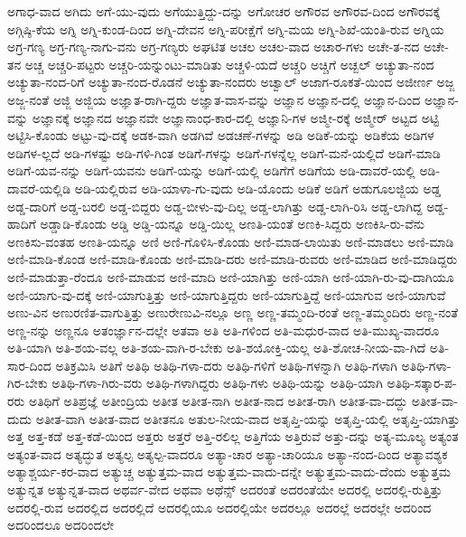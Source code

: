 {ಅಗಾಧ-ವಾದ
ಅಗಿದು
ಅಗೆ-ಯು-ವುದು
ಅಗೆಯುತ್ತಿದ್ದು-ದನ್ನು
ಅಗೋಚರ
ಅಗೌರವ
ಅಗೌರವ-ದಿಂದ
ಅಗೌರವಕ್ಕೆ
ಅಗ್ಗಿಷ್ಠಿ-ಕೆಯ
ಅಗ್ನಿ
ಅಗ್ನಿ-ಕುಂಡ-ದಿಂದ
ಅಗ್ನಿ-ದೇವನ
ಅಗ್ನಿ-ಪರೀಕ್ಷೆಗೆ
ಅಗ್ನಿ-ಮಯ
ಅಗ್ನಿ-ಶಿಖೆ-ಯಂತಿ-ರುವ
ಅಗ್ನಿಯ
ಅಗ್ರ-ಗಣ್ಯ
ಅಗ್ರ-ಗಣ್ಯ-ನಾಗು-ವನು
ಅಗ್ರ-ಗಣ್ಯರು
ಅಘಟಿತ
ಅಚಲ
ಅಚಲ-ವಾದ
ಅಚಾರ-ಗಳು
ಅಚೇ-ತ-ನದ
ಅಚೇ-ತನ
ಅಚ್ಚ
ಅಚ್ಚರಿ-ಪಟ್ಟರು
ಅಚ್ಚರಿ-ಯನ್ನುಂಟು-ಮಾಡಿತು
ಅಚ್ಚಳಿ-ಯದೆ
ಅಚ್ಚರಿ
ಅಚ್ಚಿಗೆ
ಅಚ್ಬಲ್
ಅಚ್ಯುತಾ-ನಂದ
ಅಚ್ಯುತಾ-ನಂದ-ರಿಗೆ
ಅಚ್ಯುತಾ-ನಂದ-ರೊಡನೆ
ಅಚ್ಯುತಾ-ನಂದರು
ಅಚ್ವಾಲ್
ಅಜಾಗ-ರೂಕತೆ-ಯಿಂದ
ಅಜೀರ್ಣ
ಅಜ್ಜ
ಅಜ್ಜ-ನಂತೆ
ಅಜ್ಜಿ
ಅಜ್ಜಿಯ
ಅಜ್ಞಾತ-ರಾಗಿ-ದ್ದರು
ಅಜ್ಞಾತ-ವಾಸ-ವನ್ನು
ಅಜ್ಞಾನ
ಅಜ್ಞಾನ-ದಲ್ಲಿ
ಅಜ್ಞಾನ-ದಿಂದ
ಅಜ್ಞಾನ-ವನ್ನು
ಅಜ್ಞಾನಕ್ಕೆ
ಅಜ್ಞಾನದ
ಅಜ್ಞಾನವೇ
ಅಜ್ಞಾನಾಂಧ-ಕಾರ-ದಲ್ಲಿ
ಅಜ್ಞಾನಿ-ಗಳ
ಅಜ್ಮೀ-ರಕ್ಕೆ
ಅಜ್ಮೀರ್
ಅಟ್ಟದ
ಅಟ್ಟಿ
ಅಟ್ಟಿಸಿ-ಕೊಂಡು
ಅಟ್ಟು-ವು-ದಕ್ಕೆ
ಅಡಕ-ವಾಗಿ
ಅಡಗಿವೆ
ಅಡಚಣೆ-ಗಳನ್ನು
ಅಡಿ
ಅಡಿಕೆ-ಯನ್ನು
ಅಡಿಕೆಯ
ಅಡಿಗಳ
ಅಡಿಗಳ-ಲ್ಲದೆ
ಅಡಿ-ಗಳಷ್ಟು
ಅಡಿ-ಗಳಿ-ಗಿಂತ
ಅಡಿಗೆ-ಗಳನ್ನು
ಅಡಿಗೆ-ಗಳನ್ನೆಲ್ಲ
ಅಡಿಗೆ-ಮನೆ-ಯಲ್ಲಿದೆ
ಅಡಿಗೆ-ಮಾಡಿ
ಅಡಿಗೆ-ಯವ-ನನ್ನು
ಅಡಿಗೆ-ಯವನು
ಅಡಿಗೆ-ಯನ್ನು
ಅಡಿಗೆ-ಯಲ್ಲಿ
ಅಡಿಗೆಗೆ
ಅಡಿಗೆಯ
ಅಡಿ-ದಾವರೆ-ಯಲ್ಲಿ
ಅಡಿ-ದಾವರೆ-ಯಲ್ಲಿಡಿ
ಅಡಿ-ಯಲ್ಲಿರುವ
ಅಡಿ-ಯಾಳಾ-ಗು-ವುದು
ಅಡಿ-ಯೊಂದು
ಅಡಿಕೆ
ಅಡಿಗೆ
ಅಡುಗೂಲಜ್ಜಿಯ
ಅಡ್ಡ
ಅಡ್ಡ-ದಾರಿಗೆ
ಅಡ್ಡ-ಬರಲಿ
ಅಡ್ಡ-ಬಿದ್ದರು
ಅಡ್ಡ-ಬೀಳು-ವು-ದಿಲ್ಲ
ಅಡ್ಡ-ಲಾಗಿತ್ತು
ಅಡ್ಡ-ಲಾಗಿ-ರಿಸಿ
ಅಡ್ಡ-ಲಾಗಿದ್ದ
ಅಡ್ಡ-ಹಾದಿಗೆ
ಅಡ್ಡಾಡಿ-ಕೊಂಡು
ಅಡ್ಡಿ
ಅಡ್ಡಿ-ಯನ್ನೂ
ಅಡ್ಡಿ-ಯಿಲ್ಲ
ಅಣತಿ-ಯಂತೆ
ಅಣಕಿ-ಸಿದ್ದರು
ಅಣಕಿಸಿ-ರು-ವೆನು
ಅಣಕಿಸು-ವಂತಹ
ಅಣತಿ-ಯನ್ನೂ
ಅಣಿ
ಅಣಿ-ಗೊಳಿಸಿ-ಕೊಂಡು
ಅಣಿ-ಮಾಡ-ಲಾಯಿತು
ಅಣಿ-ಮಾಡಲು
ಅಣಿ-ಮಾಡಿ
ಅಣಿ-ಮಾಡಿ-ಕೊಂಡ
ಅಣಿ-ಮಾಡಿ-ಕೊಂಡು
ಅಣಿ-ಮಾಡಿ-ದರು
ಅಣಿ-ಮಾಡಿ-ರುವರು
ಅಣಿ-ಮಾಡಿದ
ಅಣಿ-ಮಾಡಿದ್ದರು
ಅಣಿ-ಮಾಡುತ್ತಾ-ರೆಂದೂ
ಅಣಿ-ಮಾಡುವ
ಅಣಿ-ಮಾದಿ
ಅಣಿ-ಯಾಗಿತ್ತು
ಅಣಿ-ಯಾಗಿ
ಅಣಿ-ಯಾಗಿ-ರು-ವು-ದಾಗಿಯೂ
ಅಣಿ-ಯಾಗು-ವು-ದಕ್ಕೆ
ಅಣಿ-ಯಾಗುತ್ತಿತ್ತು
ಅಣಿ-ಯಾಗುತ್ತಿದ್ದರು
ಅಣಿ-ಯಾಗುತ್ತಿದ್ದೆ
ಅಣಿ-ಯಾಗುವ
ಅಣಿ-ಯಾಗುವೆ
ಅಣು-ವಿನ
ಅಣುರಣಿತ-ವಾಗುತ್ತಿತ್ತು
ಅಣುರೇಣುವಿ-ನಲ್ಲೂ
ಅಣ್ಣ
ಅಣ್ಣ-ತಮ್ಮಂದಿ-ರಂತೆ
ಅಣ್ಣ-ತಮ್ಮಂದಿರು
ಅಣ್ಣ-ನಂತೆ
ಅಣ್ಣ-ನನ್ನು
ಅಣ್ಣನೂ
ಅತಂರ್ಜ್ಞಾನ-ದಲ್ಲೇ
ಅತವಾ
ಅತಿ
ಅತಿ-ಗಳಿಂದ
ಅತಿ-ಮಧುರ-ವಾದ
ಅತಿ-ಮುಖ್ಯ-ವಾದರೂ
ಅತಿ-ಯಾಗಿ
ಅತಿ-ಶಯ-ವಲ್ಲ
ಅತಿ-ಶಯ-ವಾಗಿ-ರ-ಬೇಕು
ಅತಿ-ಶಯೋಕ್ತಿ-ಯಲ್ಲ
ಅತಿ-ಶೋಚ-ನೀಯ-ವಾ-ಗಿದೆ
ಅತಿ-ಸಾರ-ದಿಂದ
ಅತಿಕ್ರಮಿಸಿ
ಅತಿಗೆ
ಅತಿಥಿ
ಅತಿಥಿ-ಗಳಾ-ದರು
ಅತಿಥಿ-ಗಳಿಗೆ
ಅತಿಥಿ-ಗಳನ್ನಾಗಿ
ಅತಿಥಿ-ಗಳಾಗಿ
ಅತಿಥಿ-ಗಳಾ-ಗಿರ-ಬೇಕು
ಅತಿಥಿ-ಗಳಾ-ಗಿರು-ವರು
ಅತಿಥಿ-ಗಳಾಗಿದ್ದರು
ಅತಿಥಿ-ಗಳು
ಅತಿಥಿ-ಯನ್ನು
ಅತಿಥಿ-ಯಾಗಿ
ಅತಿಥಿ-ಸತ್ಕಾರ-ಪ-ರರು
ಅತಿಥಿಗೆ
ಅತಿಪ್ರಜ್ಞೆ
ಅತೀಂದ್ರಿಯ
ಅತೀತ
ಅತೀತ-ನಾಗಿ
ಅತೀತ-ನಾದ
ಅತೀತ-ರಾಗಿ
ಅತೀತ-ವಾ-ದದ್ದು
ಅತೀತ-ವಾ-ದುದು
ಅತೀತ-ವಾಗಿ
ಅತೀತ-ವಾದ
ಅತೀತನೂ
ಅತುಲ-ನೀಯ-ವಾದ
ಅತೃಪ್ತಿ-ಯನ್ನು
ಅತೃಪ್ತಿ-ಯಲ್ಲಿ
ಅತೃಪ್ತಿ-ಯಾಗಿತ್ತು
ಅತ್ತ
ಅತ್ತ-ಕಡೆ
ಅತ್ತ-ಕಡೆ-ಯಿಂದ
ಅತ್ತರು
ಅತ್ತರೆ
ಅತ್ತಿ-ರಲಿಲ್ಲ
ಅತ್ತಿಗೆಯ
ಅತ್ತಿರುವೆ
ಅತ್ತು-ದನ್ನು
ಅತ್ಯ-ಮೂಲ್ಯ
ಅತ್ಯಂತ
ಅತ್ಯಂತ-ವಾದ
ಅತ್ಯದ್ಭುತ
ಅತ್ಯಲ್ಪ
ಅತ್ಯಲ್ಪ-ವಾದರೂ
ಅತ್ಯಾ-ಚಾರ
ಅತ್ಯಾ-ಚಾರಿಯೂ
ಅತ್ಯಾ-ನಂದ-ದಿಂದ
ಅತ್ಯಾವಶ್ಯಕ
ಅತ್ಯಾಶ್ಚರ್ಯ-ಕರ-ವಾದ
ಅತ್ಯುಚ್ಚ
ಅತ್ಯುತ್ತಮ-ವಾದ
ಅತ್ಯುತ್ತಮ-ವಾದು-ದನ್ನೇ
ಅತ್ಯುತ್ತಮ-ವಾದು-ದೆಂದು
ಅತ್ಯುತ್ತಮ
ಅತ್ಯುನ್ನತ
ಅತ್ಯುನ್ನತ-ವಾದ
ಅಥರ್ವ-ವೇದ
ಅಥವಾ
ಅಥೆನ್ಸ್
ಅದರಂತೆ
ಅದರಂತೆಯೇ
ಅದರಲ್ಲಿ
ಅದರಲ್ಲಿ-ರುತ್ತಿತ್ತು
ಅದರಲ್ಲಿ-ರುವ
ಅದರಲ್ಲಿದ
ಅದರಲ್ಲಿದೆ
ಅದರಲ್ಲಿಯೂ
ಅದರಲ್ಲಿಯೇ
ಅದರಲ್ಲೂ
ಅದರಲ್ಲೆ
ಅದರಲ್ಲೇ
ಅದರಿಂದ
ಅದರಿಂದಲೂ
ಅದರಿಂದಲೇ
}
